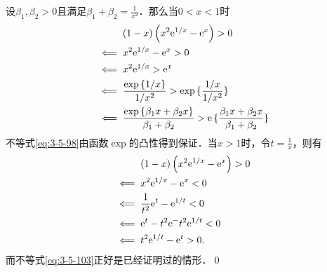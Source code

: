 \prove 设$\beta_1, \beta_2 > 0$且满足$\beta_1 + \beta_2 = \displaystyle\frac{1}{x^2}$．那么当$0 < x < 1$时
\begin{align}
    &\mathrel{\phantom{\impliedby}} \left(1-x\right)\left(x^2 \mathrm{e}^{1/x} - \mathrm{e}^x\right) > 0  \\
    &\impliedby x^2 \mathrm{e}^{1/x} - \mathrm{e}^{x} > 0 \\
    &\impliedby x^2 \mathrm{e}^{1/x} > \mathrm{e}^{x} \\
    &\impliedby \frac{\exp \, \{ 1/x \}}{1/x^2} > \exp \, \{ \frac{1/x}{1/x^2} \} \\
    &\impliedby \frac{\exp \, \{ \beta_1 x + \beta_2 x\}}{\beta_1 + \beta_2} > \mathrm{e} \, \{ \frac{\beta_1 x + \beta_2 x}{\beta_1 + \beta_2} \} \label{eq:3-5-98}
\end{align}
不等式\ref{eq:3-5-98}由函数$\exp$的凸性得到保证．当$x > 1$时，令$t = \displaystyle\frac{1}{x}$，则有
\begin{align}
    &\mathrel{\phantom{\impliedby}} \left(1-x\right)\left(x^2 \mathrm{e}^{1/x} - \mathrm{e}^x\right) > 0  \\
    &\impliedby x^2 \mathrm{e}^{1/x} - \mathrm{e}^{x} < 0 \\
    &\impliedby \frac{1}{t^2} \mathrm{e}^t - \mathrm{e}^{1/t} < 0 \\
    &\impliedby \mathrm{e}^t - t^2 \mathrm{e}^ - t^2 \mathrm{e}^{1/t} < 0 \\
    &\impliedby t^2 \mathrm{e}^{1/t} - \mathrm{e}^t > 0. \label{eq:3-5-103}
\end{align}
而不等式\ref{eq:3-5-103}正好是已经证明过的情形．\qed\bigskip